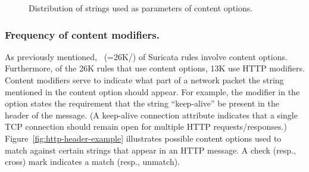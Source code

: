 \documentclass[sigconf,review, anonymous]{acmart}
\begin{document}
\begin{figure}[t!]
  \centering
  \caption{\label{fig:distribution-strings}Distribution of strings
    used as parameters of content options.}
\end{figure}

\subsubsection{Frequency of content modifiers.} As previously
mentioned, \percRulesWithContent\ (=26K/\numrulessuri) of Suricata
rules involve content options. Furthermore, of the 26K rules that use
content options, 13K use HTTP modifiers.  Content modifiers
serve to indicate what part of a network packet the string mentioned
in the content option should appear. For example, the modifier
 in the option  states the requirement that the string ``keep-alive''
be present in the header of the message. (A keep-alive connection
attribute indicates that a single TCP connection should remain open
for multiple HTTP requests/responses.)
Figure~\ref{fig:http-header-example} illustrates possible content
options used to match against certain strings that appear in an HTTP
message. A check (resp., cross) mark indicates a match (resp.,
unmatch).
\end{document}
